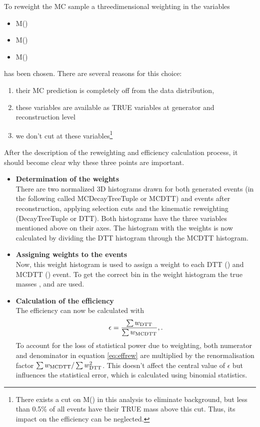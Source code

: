 To reweight the \Dz\proton MC sample a threedimensional weighting in the variables
\begin{itemize}
    \item M(\Dz\proton)
    \item M(\Dz\mun)
    \item M(\Dz\proton\mun)
\end{itemize}
has been chosen. There are several reasons for this choice:
\begin{enumerate}
    \item their MC prediction is completely off from the data distribution,
    \item these variables are available as TRUE variables at generator and reconstruction level
    \item we don't cut at these variables\footnote{There exists a cut on M(\Dz\proton\mun) in this analysis to eliminate \decay{\Lb}{\Dz\proton\pim} background, but less than 0.5\% of all events have their TRUE mass above this cut. Thus, its impact on the efficiency can be neglected.}
\end{enumerate}
After the description of the reweighting and efficiency calculation process, it should become clear why these three points are important.
\begin{itemize}
    \item \textbf{Determination of the weights} \\
          There are two normalized 3D histograms drawn for both generated events (in the following called MCDecayTreeTuple or MCDTT) and events after reconstruction, applying selection cuts and the kinematic reweighting (DecayTreeTuple or DTT). 
          Both histograms have the three variables mentioned above on their axes.
          The histogram with the weights is now calculated by dividing the DTT histogram through the MCDTT histogram.
    \item \textbf{Assigning weights to the events} \\
          Now, this weight histogram is used to assign a weight to each DTT () and MCDTT () event.
          To get the correct bin in the weight histogram the true masses \Mtrue{\Dz\proton}, \Mtrue{\Dz\mun} and \Mtrue{\Dz\proton\mun} are used.
    \item \textbf{Calculation of the efficiency} \\
          The efficiency can now be calculated with
          \begin{align}
              \epsilon = \frac{\sum w_{\text{DTT}}}{\sum w_{\text{MCDTT}}}, \label{eq:effrew}.
          \end{align}
          To account for the loss of statistical power due to weighting, both numerator and denominator in equation \ref{eq:effrew} are multiplied by the renormalisation factor $\sum w_{\text{MCDTT}} / \sum w_{\text{DTT}}^2$. 
          This doesn't affect the central value of $\epsilon$ but influences the statistical error, which is calculated using binomial statistics.
\end{itemize}
